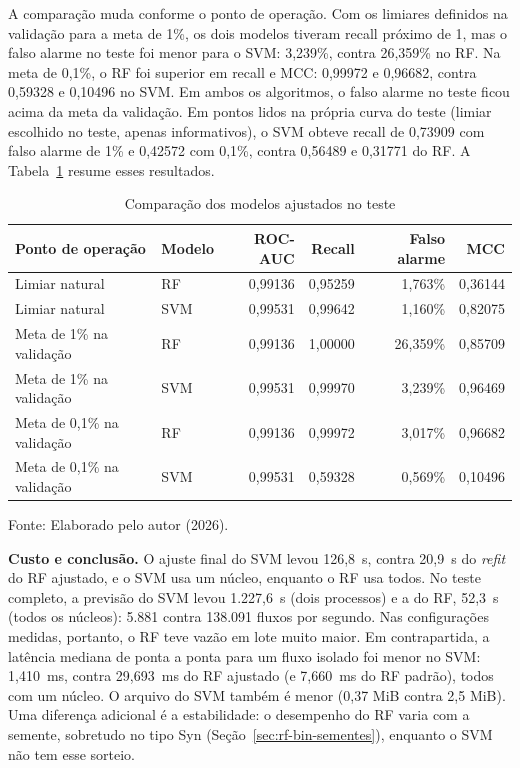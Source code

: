 \documentclass[
    12pt,                %
    openright,           %
    oneside,             %
    a4paper,             %
    english,             %
    brazil               %
]{abntex2}
\begin{document}
A comparação muda conforme o ponto de operação. Com os limiares definidos na validação para a meta de 1\%, os dois modelos tiveram recall próximo de 1, mas o falso alarme no teste foi menor para o SVM: 3,239\%, contra 26,359\% no RF. Na meta de 0,1\%, o RF foi superior em recall e MCC: 0,99972 e 0,96682, contra 0,59328 e 0,10496 no SVM. Em ambos os algoritmos, o falso alarme no teste ficou acima da meta da validação. Em pontos lidos na própria curva do teste (limiar escolhido no teste, apenas informativos), o SVM obteve recall de 0,73909 com falso alarme de 1\% e 0,42572 com 0,1\%, contra 0,56489 e 0,31771 do RF. A Tabela~\ref{tab:comparacao-rf-svm} resume esses resultados.

\begin{table}
\centering
\caption{Comparação dos modelos ajustados no teste}
\label{tab:comparacao-rf-svm}
\begin{tabular}{llrrrr}
\hline
Ponto de operação & Modelo & ROC-AUC & Recall & Falso alarme & MCC \\
\hline
Limiar natural & RF & 0,99136 & 0,95259 & 1,763\% & 0,36144 \\
Limiar natural & SVM & 0,99531 & 0,99642 & 1,160\% & 0,82075 \\
Meta de 1\% na validação & RF & 0,99136 & 1,00000 & 26,359\% & 0,85709 \\
Meta de 1\% na validação & SVM & 0,99531 & 0,99970 & 3,239\% & 0,96469 \\
Meta de 0,1\% na validação & RF & 0,99136 & 0,99972 & 3,017\% & 0,96682 \\
Meta de 0,1\% na validação & SVM & 0,99531 & 0,59328 & 0,569\% & 0,10496 \\
\hline
\end{tabular}
\par\smallskip
Fonte: Elaborado pelo autor (2026).
\end{table}

\textbf{Custo e conclusão.} O ajuste final do SVM levou 126,8~s, contra 20,9~s do \textit{refit} do RF ajustado, e o SVM usa um núcleo, enquanto o RF usa todos. No teste completo, a previsão do SVM levou 1.227,6~s (dois processos) e a do RF, 52,3~s (todos os núcleos): 5.881 contra 138.091 fluxos por segundo. Nas configurações medidas, portanto, o RF teve vazão em lote muito maior. Em contrapartida, a latência mediana de ponta a ponta para um fluxo isolado foi menor no SVM: 1,410~ms, contra 29,693~ms do RF ajustado (e 7,660~ms do RF padrão), todos com um núcleo. O arquivo do SVM também é menor (0,37 MiB contra 2,5 MiB). Uma diferença adicional é a estabilidade: o desempenho do RF varia com a semente, sobretudo no tipo Syn (Seção~\ref{sec:rf-bin-sementes}), enquanto o SVM não tem esse sorteio.
\end{document}
